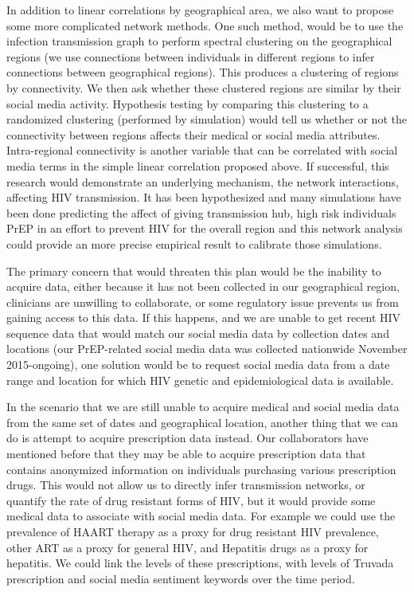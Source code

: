 In addition to linear correlations by geographical area, we also want to propose some more complicated network methods. One such method, would be to use the infection transmission graph to perform spectral clustering on the geographical regions (we use connections between individuals in different regions to infer connections between geographical regions). This produces a clustering of regions by connectivity. We then ask whether these clustered regions are similar by their social media activity. Hypothesis testing by comparing this clustering to a randomized clustering (performed by simulation) would tell us whether or not the connectivity between regions affects their medical or social media attributes. Intra-regional connectivity is another variable that can be correlated with social media terms in the simple linear correlation proposed above. If successful, this research would demonstrate an underlying mechanism, the network interactions, affecting HIV transmission. It has been hypothesized and many simulations have been done predicting the affect of giving transmission hub, high risk individuals PrEP in an effort to prevent HIV for the overall region and this network analysis could provide an more precise empirical result to calibrate those simulations.

The primary concern that would threaten this plan would be the inability to acquire data, either because it has not been collected in our geographical region, clinicians are unwilling to collaborate, or some regulatory issue prevents us from gaining access to this data. If this happens, and we are unable to get recent HIV sequence data that would match our social media data by collection dates and locations (our PrEP-related social media data was collected nationwide November 2015-ongoing), one solution would be to request social media data from a date range and location for which HIV genetic and epidemiological data is available.

In the scenario that we are still unable to acquire medical and social media data from the same set of dates and geographical location, another thing that we can do is attempt to acquire prescription data instead. Our collaborators have mentioned before that they may be able to acquire prescription data that contains anonymized information on individuals purchasing various prescription drugs. This would not allow us to directly infer transmission networks, or quantify the rate of drug resistant forms of HIV, but it would provide some medical data to associate with social media data. For example we could use the prevalence of HAART therapy as a proxy for drug resistant HIV prevalence, other ART as a proxy for general HIV, and Hepatitis drugs as a proxy for hepatitis. We could link the levels of these prescriptions, with levels of Truvada prescription and social media sentiment keywords over the time period.



